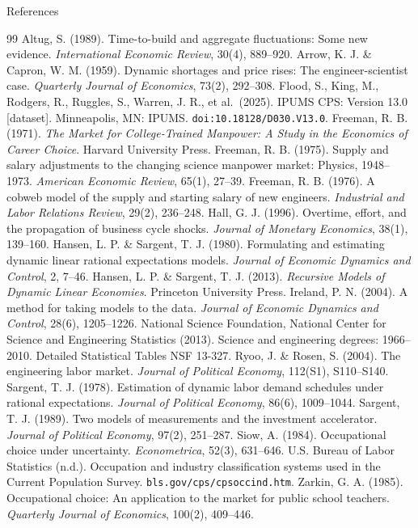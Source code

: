 \documentclass[10pt]{beamer}
\begin{document}
\begin{frame}[allowframebreaks]{References}
  \scriptsize
  \begin{thebibliography}{99}
     Altug, S. (1989). Time-to-build and aggregate fluctuations: Some new evidence. \emph{International Economic Review}, 30(4), 889--920.
     Arrow, K. J. \& Capron, W. M. (1959). Dynamic shortages and price rises: The engineer-scientist case. \emph{Quarterly Journal of Economics}, 73(2), 292--308.
     Flood, S., King, M., Rodgers, R., Ruggles, S., Warren, J. R., et al.\ (2025). IPUMS CPS: Version 13.0 [dataset]. Minneapolis, MN: IPUMS. \texttt{doi:10.18128/D030.V13.0}.
     Freeman, R. B. (1971). \emph{The Market for College-Trained Manpower: A Study in the Economics of Career Choice}. Harvard University Press.
     Freeman, R. B. (1975). Supply and salary adjustments to the changing science manpower market: Physics, 1948--1973. \emph{American Economic Review}, 65(1), 27--39.
     Freeman, R. B. (1976). A cobweb model of the supply and starting salary of new engineers. \emph{Industrial and Labor Relations Review}, 29(2), 236--248.
     Hall, G. J. (1996). Overtime, effort, and the propagation of business cycle shocks. \emph{Journal of Monetary Economics}, 38(1), 139--160.
     Hansen, L. P. \& Sargent, T. J. (1980). Formulating and estimating dynamic linear rational expectations models. \emph{Journal of Economic Dynamics and Control}, 2, 7--46.
     Hansen, L. P. \& Sargent, T. J. (2013). \emph{Recursive Models of Dynamic Linear Economies}. Princeton University Press.
     Ireland, P. N. (2004). A method for taking models to the data. \emph{Journal of Economic Dynamics and Control}, 28(6), 1205--1226.
     National Science Foundation, National Center for Science and Engineering Statistics (2013). Science and engineering degrees: 1966--2010. Detailed Statistical Tables NSF 13-327.
     Ryoo, J. \& Rosen, S. (2004). The engineering labor market. \emph{Journal of Political Economy}, 112(S1), S110--S140.
     Sargent, T. J. (1978). Estimation of dynamic labor demand schedules under rational expectations. \emph{Journal of Political Economy}, 86(6), 1009--1044.
     Sargent, T. J. (1989). Two models of measurements and the investment accelerator. \emph{Journal of Political Economy}, 97(2), 251--287.
     Siow, A. (1984). Occupational choice under uncertainty. \emph{Econometrica}, 52(3), 631--646.
     U.S. Bureau of Labor Statistics (n.d.). Occupation and industry classification systems used in the Current Population Survey. \texttt{bls.gov/cps/cpsoccind.htm}.
     Zarkin, G. A. (1985). Occupational choice: An application to the market for public school teachers. \emph{Quarterly Journal of Economics}, 100(2), 409--446.
  \end{thebibliography}
\end{frame}
\end{document}
